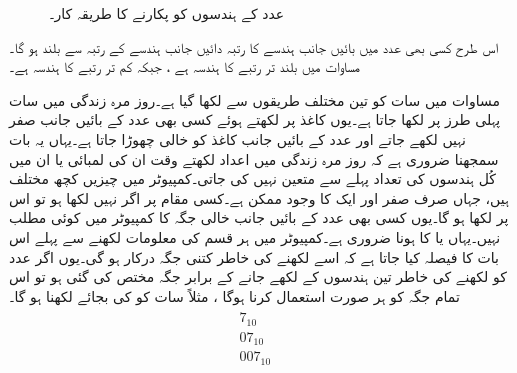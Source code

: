 \begin{figure}
\centering
\begin{subfigure}{0.45\textwidth}
\centering
{}
\end{subfigure}\hfill
\begin{subfigure}{0.45\textwidth}
\centering
{}
\end{subfigure}
\caption{عدد کے ہندسوں کو پکارنے کا طریقہ کار۔}
\label{شکل_ثنائی_ہندسوں_کے_نام}
\end{figure}

	اس طرح کسی بھی عدد میں بائیں جانب ہندسے کا رتبہ دائیں جانب ہندسے کے رتبہ سے بلند ہو گا۔مساوات  میں بلند تر رتبے کا ہندسہ  ہے ، جبکہ کم تر رتبے کا ہندسہ ہے۔
	
	مساوات  میں سات کو تین مختلف طریقوں سے لکھا گیا ہے۔روز مرہ زندگی میں سات پہلی طرز پر لکھا جاتا ہے۔یوں کاغذ پر لکھتے ہوئے کسی بھی عدد کے بائیں جانب صفر نہیں لکھے جاتے اور عدد کے بائیں جانب کاغذ کو خالی چھوڑا جاتا ہے۔یہاں یہ بات سمجھنا ضروری ہے کہ روز مرہ زندگی میں اعداد لکھتے وقت ان کی لمبائی یا ان میں کُل ہندسوں کی تعداد پہلے سے متعین نہیں کی جاتی۔کمپیوٹر میں چیزیں کچھ مختلف ہیں، جہاں صرف صفر  اور ایک  کا وجود ممکن ہے۔کسی مقام پر اگر  نہیں لکھا ہو تو اس پر  لکھا ہو گا۔یوں کسی بھی عدد کے بائیں جانب خالی جگہ کا کمپیوٹر میں کوئی مطلب نہیں۔یہاں  یا  کا ہونا ضروری ہے۔کمپیوٹر میں ہر قسم کی معلومات لکھنے سے پہلے اس بات کا فیصلہ کیا جاتا ہے کہ اسے لکھنے کی خاطر کتنی جگہ درکار ہو گی۔یوں اگر عدد کو لکھنے کی خاطر تین ہندسوں کے لکھے جانے کے برابر جگہ مختص کی گئی ہو تو اس تمام جگہ کو ہر صورت استعمال کرنا ہوگا ، مثلاً سات کو  کی بجائے  لکھنا ہو گا۔
\begin{gather}
\begin{aligned}\label{مساوات_ثنائی_ہندسوں}
7_{10} &\\
07_{10}&\\
007_{10}&
\end{aligned}
\end{gather}

